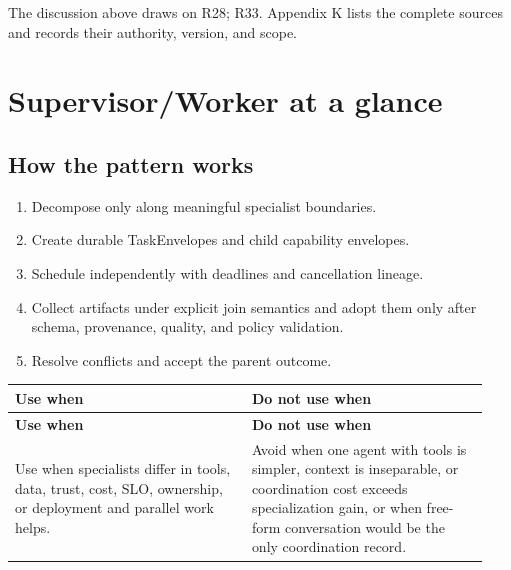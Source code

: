 The discussion above draws on R28; R33. Appendix K lists the complete sources and records their authority, version, and scope.\par

\section{Supervisor/Worker at a glance}

\subsection{How the pattern works}

\begin{enumerate}

\item Decompose only along meaningful specialist boundaries.

\item Create durable TaskEnvelopes and child capability envelopes.

\item Schedule independently with deadlines and cancellation lineage.

\item Collect artifacts under explicit join semantics and adopt them only after schema, provenance, quality, and policy validation.

\item Resolve conflicts and accept the parent outcome.

\end{enumerate}

\BookTableStart
\small
\begin{longtable}{@{}Y{0.4700\linewidth}Y{0.4700\linewidth}@{}}
\color{white}\bfseries \textbf{Use when} & \color{white}\bfseries \textbf{Do not use when} \\
\endfirsthead
{}
\color{white}\bfseries \textbf{Use when} & \color{white}\bfseries \textbf{Do not use when} \\
\endhead
Use when specialists differ in tools, data, trust, cost, SLO, ownership, or deployment and parallel work helps. & Avoid when one agent with tools is simpler, context is inseparable, or coordination cost exceeds specialization gain, or when free-form conversation would be the only coordination record. \\
\end{longtable}
\BookTableEnd

